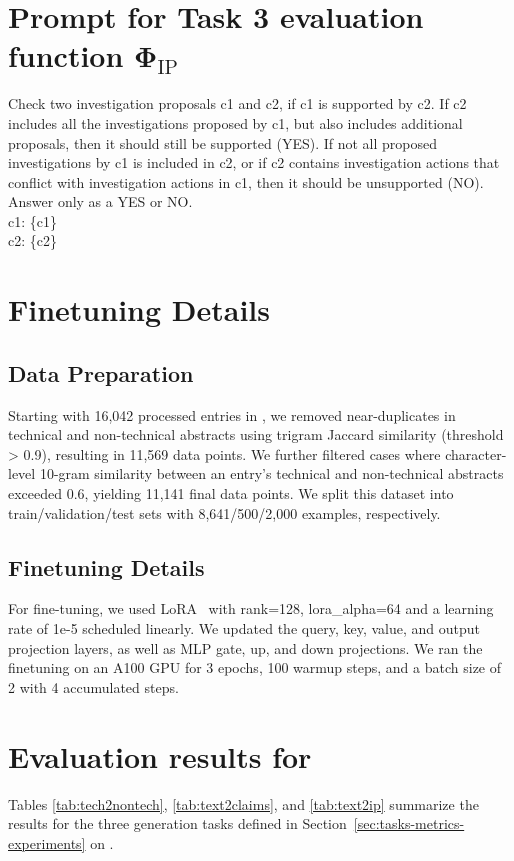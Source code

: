 \documentclass[11pt]{article}
\begin{document}
\section{Prompt for Task 3 evaluation function $\mathbf{\Phi}_{\textrm{IP}}$}
\label{appendix:phi_IP}
\begin{mdframed}[backgroundcolor=blue!20]
\noindent Check two investigation proposals c1 and c2, if c1 is supported by c2. If c2 includes all the investigations proposed by c1, but also includes additional proposals, then it should still be supported (YES). If not all proposed investigations by c1 is included in c2, or if c2 contains investigation actions that conflict with investigation actions in c1, then it should be unsupported (NO). Answer only as a YES or NO.\\
\noindent c1: \{c1\}\\
\noindent c2: \{c2\}
\end{mdframed}


\section{Finetuning Details}
\label{appendix:finetune-details}
\subsection{Data Preparation}

Starting with 16,042 processed entries in \DatasetNameMatSci, we removed near-duplicates in technical and non-technical abstracts using trigram Jaccard similarity (threshold > 0.9), resulting in 11,569 data points. We further filtered cases where character-level 10-gram similarity between an entry's technical and non-technical abstracts exceeded 0.6, yielding 11,141 final data points. We split this dataset into train/validation/test sets with 8,641/500/2,000 examples, respectively.

\subsection{Finetuning Details}
For fine-tuning, we used LoRA~\cite{hu2021lora} with rank=128, lora\_alpha=64 and a learning rate of 1e-5 scheduled linearly. We updated the query, key, value, and output projection layers, as well as MLP gate, up, and down projections. We ran the finetuning on an A100 GPU for 3 epochs, 100 warmup steps, and a batch size of 2 with 4 accumulated steps.

\section{Evaluation results for \DatasetNameTwentyK}
\label{appendix:20k-eval}
Tables \ref{tab:tech2nontech}, \ref{tab:text2claims}, and \ref{tab:text2ip} summarize the results for the three generation tasks defined in Section~\ref{sec:tasks-metrics-experiments} on \DatasetNameTwentyK.
\end{document}
